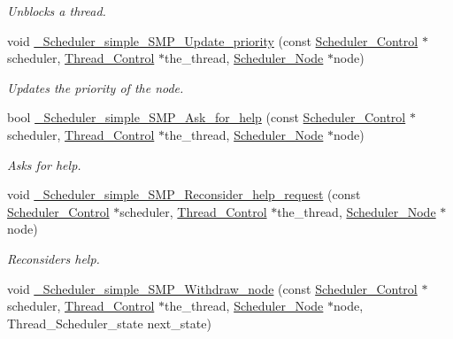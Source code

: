 \begin{DoxyCompactItemize}
\begin{DoxyCompactList}\small\item\em Unblocks a thread. \end{DoxyCompactList}\item 
void \mbox{\hyperlink{group__RTEMSScoreSchedulerSMPSimple_gad0f8897ed14a46c9b5eb74f25b0dcad3}{\+\_\+\+Scheduler\+\_\+simple\+\_\+\+S\+M\+P\+\_\+\+Update\+\_\+priority}} (const \mbox{\hyperlink{struct__Scheduler__Control}{Scheduler\+\_\+\+Control}} $\ast$scheduler, \mbox{\hyperlink{struct__Thread__Control}{Thread\+\_\+\+Control}} $\ast$the\+\_\+thread, \mbox{\hyperlink{structScheduler__Node}{Scheduler\+\_\+\+Node}} $\ast$node)
\begin{DoxyCompactList}\small\item\em Updates the priority of the node. \end{DoxyCompactList}\item 
bool \mbox{\hyperlink{group__RTEMSScoreSchedulerSMPSimple_ga82fa2eede360ac2d51a38e4b9b4e6aa1}{\+\_\+\+Scheduler\+\_\+simple\+\_\+\+S\+M\+P\+\_\+\+Ask\+\_\+for\+\_\+help}} (const \mbox{\hyperlink{struct__Scheduler__Control}{Scheduler\+\_\+\+Control}} $\ast$scheduler, \mbox{\hyperlink{struct__Thread__Control}{Thread\+\_\+\+Control}} $\ast$the\+\_\+thread, \mbox{\hyperlink{structScheduler__Node}{Scheduler\+\_\+\+Node}} $\ast$node)
\begin{DoxyCompactList}\small\item\em Asks for help. \end{DoxyCompactList}\item 
void \mbox{\hyperlink{group__RTEMSScoreSchedulerSMPSimple_gaa1f37b5bfadf118715a2dad3758c251b}{\+\_\+\+Scheduler\+\_\+simple\+\_\+\+S\+M\+P\+\_\+\+Reconsider\+\_\+help\+\_\+request}} (const \mbox{\hyperlink{struct__Scheduler__Control}{Scheduler\+\_\+\+Control}} $\ast$scheduler, \mbox{\hyperlink{struct__Thread__Control}{Thread\+\_\+\+Control}} $\ast$the\+\_\+thread, \mbox{\hyperlink{structScheduler__Node}{Scheduler\+\_\+\+Node}} $\ast$node)
\begin{DoxyCompactList}\small\item\em Reconsiders help. \end{DoxyCompactList}\item 
void \mbox{\hyperlink{group__RTEMSScoreSchedulerSMPSimple_gabb25490f5a3a7b27ccf090625e964cc8}{\+\_\+\+Scheduler\+\_\+simple\+\_\+\+S\+M\+P\+\_\+\+Withdraw\+\_\+node}} (const \mbox{\hyperlink{struct__Scheduler__Control}{Scheduler\+\_\+\+Control}} $\ast$scheduler, \mbox{\hyperlink{struct__Thread__Control}{Thread\+\_\+\+Control}} $\ast$the\+\_\+thread, \mbox{\hyperlink{structScheduler__Node}{Scheduler\+\_\+\+Node}} $\ast$node, Thread\+\_\+\+Scheduler\+\_\+state next\+\_\+state)

\end{DoxyCompactItemize}
